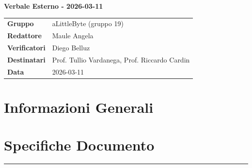 \documentclass[a4paper,12pt]{article}
\begin{document}
\thispagestyle{firstpage}

\vspace*{0.5cm}

\begin{center}
    {\LARGE \textbf{Verbale Esterno - 2026-03-11}}
\end{center}

\vspace{1.5cm}

\begin{center}
    \renewcommand{\arraystretch}{1.3}
    \begin{tcolorbox}[
        width=0.92\textwidth,
        colback=gray!6,
        colframe=gray!45,
        boxrule=0.5pt,
        arc=2mm,
        boxsep=0pt,
        left=8pt, right=8pt, top=8pt, bottom=8pt
    ]
        \begin{tabularx}{\linewidth}{>{\bfseries}p{3.5cm} X}
            Gruppo      & aLittleByte (gruppo 19) \\
            Redattore   & Maule Angela \\
            Verificatori& Diego Belluz\\
            Destinatari & Prof. Tullio Vardanega, Prof. Riccardo Cardin \\
            Data        &  2026-03-11\\
        \end{tabularx}
    \end{tcolorbox}
\end{center}

\newpage

\tableofcontents
\newpage

\section{Informazioni Generali}
\section*{Specifiche Documento}
\hrule
\vspace{1cm}
\end{document}

